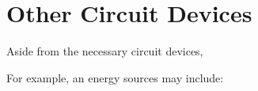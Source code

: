 %  
%
%
%
%
%
%
%
%
\section{Other Circuit Devices}

Aside from the necessary circuit devices,

For example, an energy sources may include:

